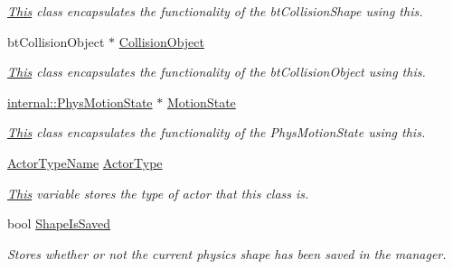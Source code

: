 \begin{DoxyCompactItemize}
\begin{DoxyCompactList}\small\item\em \hyperlink{structThis}{This} class encapsulates the functionality of the btCollisionShape using this. \item\end{DoxyCompactList}\item 
\hypertarget{classphys_1_1ActorBase_a70676c52ffee64705a7b463d29b60429}{
btCollisionObject $\ast$ \hyperlink{classphys_1_1ActorBase_a70676c52ffee64705a7b463d29b60429}{CollisionObject}}
\label{d8/d0f/classphys_1_1ActorBase_a70676c52ffee64705a7b463d29b60429}

\begin{DoxyCompactList}\small\item\em \hyperlink{structThis}{This} class encapsulates the functionality of the btCollisionObject using this. \item\end{DoxyCompactList}\item 
\hypertarget{classphys_1_1ActorBase_ab776527aa927b8787313c50530cc24ba}{
\hyperlink{classphys_1_1internal_1_1PhysMotionState}{internal::PhysMotionState} $\ast$ \hyperlink{classphys_1_1ActorBase_ab776527aa927b8787313c50530cc24ba}{MotionState}}
\label{d8/d0f/classphys_1_1ActorBase_ab776527aa927b8787313c50530cc24ba}

\begin{DoxyCompactList}\small\item\em \hyperlink{structThis}{This} class encapsulates the functionality of the PhysMotionState using this. \item\end{DoxyCompactList}\item 
\hypertarget{classphys_1_1ActorBase_a42baa3657656300eeefe3ed48f526a00}{
\hyperlink{classphys_1_1ActorBase_aff3a7c464e8ce82576073f8f891434b7}{ActorTypeName} \hyperlink{classphys_1_1ActorBase_a42baa3657656300eeefe3ed48f526a00}{ActorType}}
\label{d8/d0f/classphys_1_1ActorBase_a42baa3657656300eeefe3ed48f526a00}

\begin{DoxyCompactList}\small\item\em \hyperlink{structThis}{This} variable stores the type of actor that this class is. \item\end{DoxyCompactList}\item 
\hypertarget{classphys_1_1ActorBase_a22c0ab01bdc3e1e5c656fb0f201f6929}{
bool \hyperlink{classphys_1_1ActorBase_a22c0ab01bdc3e1e5c656fb0f201f6929}{ShapeIsSaved}}
\label{d8/d0f/classphys_1_1ActorBase_a22c0ab01bdc3e1e5c656fb0f201f6929}

\begin{DoxyCompactList}\small\item\em Stores whether or not the current physics shape has been saved in the manager. \item\end{DoxyCompactList}\end{DoxyCompactItemize}
